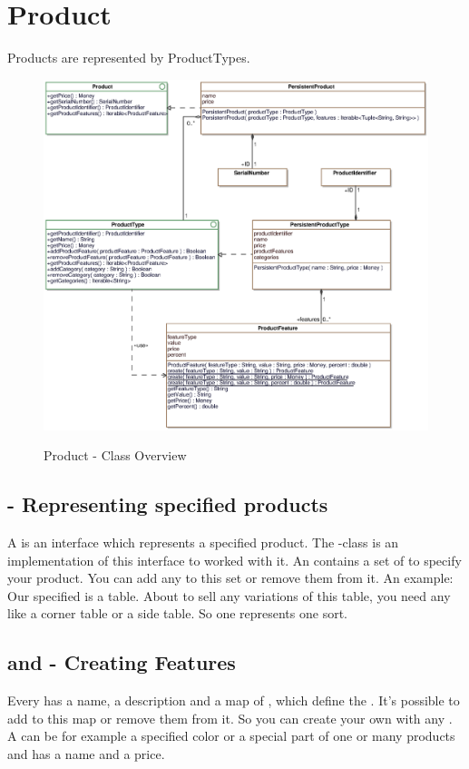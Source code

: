 \section{Product}

Products are represented by ProductTypes.

\begin{figure}[ht]
	\centering
  \includegraphics[scale =.7]{images/Product_Overview.eps}
	\label{product_overview}
	\caption{Product - Class Overview}
\end{figure}

\subsection{ - Representing specified products}
A  is an interface which represents a specified product. The -class is an implementation of this interface to worked with it.
An  contains a set of  to specify your product. You can add any   to this set or remove them from it.
An example: Our specified  is a table. About to sell any variations of this table, you need any  like a corner table or a side table. 
So one  represents one sort.

\subsection{ and  - Creating Features}
Every  has a name, a description and a map of , which define the . It's possible to add 
 to this map or remove them from it. So you can create your own  with any .\\
A  can be for example a specified color or a special part of one or many products and has a name and a price.   

